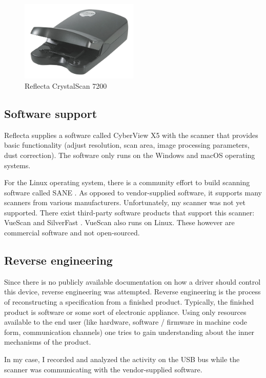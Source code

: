 \documentclass{article}
\begin{document}
\begin{figure}[H]
  \caption{Reflecta CrystalScan 7200}
  \centering
  \includegraphics[width=0.5\textwidth]{images/presentation/the_scanner.jpg}
\end{figure}

\subsection{Software support}

Reflecta supplies a software called CyberView X5 with the scanner that
provides basic functionality (adjust resolution, scan area, image processing parameters, dust correction).
The software only runs on the Windows and macOS operating systems.

For the Linux operating system, there is a community effort to build scanning software
called SANE \cite{saneproject}. As opposed to vendor-supplied software, it supports many scanners
from various manufacturers. Unfortunately, my scanner was not yet supported.
There exist third-party software products that support this scanner: VueScan \cite{vuescan}
and SilverFast \cite{silverfast}. VueScan also runs on Linux. These however are commercial software
and not open-sourced.

\subsection{Reverse engineering}

Since there is no publicly available documentation on how a driver should control this
device, reverse engineering was attempted.
Reverse engineering is the process of reconstructing a specification from a finished
product. Typically, the finished product is software or some sort of electronic
appliance.
Using only resources available to the end user (like hardware,
software / firmware in machine code form, communication channels)
one tries to gain understanding about the inner mechanisms of the product.

In my case, I recorded and analyzed the activity on the USB bus while the scanner
was communicating with the vendor-supplied software.
\end{document}
